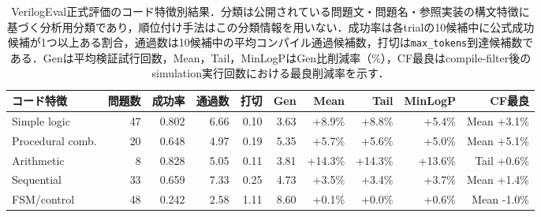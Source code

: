 \begin{table}[t]
\caption{VerilogEval正式評価のコード特徴別結果．分類は公開されている問題文・問題名・参照実装の構文特徴に基づく分析用分類であり，順位付け手法はこの分類情報を用いない．成功率は各trialの10候補中に公式成功候補が1つ以上ある割合，通過数は10候補中の平均コンパイル通過候補数，打切は\texttt{max\_tokens}到達候補数である．Genは平均検証試行回数，Mean，Tail，MinLogPはGen比削減率（\%），CF最良はcompile-filter後のsimulation実行回数における最良削減率を示す．}
\label{tab:verilog_eval_feature}
\centering
\small
\setlength{\tabcolsep}{3pt}
\begin{tabular}{@{}lrrrrrrrrr@{}}
\hline
コード特徴 & 問題数 & 成功率 & 通過数 & 打切 & Gen & Mean & Tail & MinLogP & CF最良 \\
\hline
Simple logic & 47 & 0.802 & 6.66 & 0.10 & 3.63 & +8.9\% & +8.8\% & +5.4\% & Mean +3.1\% \\
Procedural comb. & 20 & 0.648 & 4.97 & 0.19 & 5.35 & +5.7\% & +5.6\% & +5.0\% & Mean +5.1\% \\
Arithmetic & 8 & 0.828 & 5.05 & 0.11 & 3.81 & +14.3\% & +14.3\% & +13.6\% & Tail +0.6\% \\
Sequential & 33 & 0.659 & 7.33 & 0.25 & 4.73 & +3.5\% & +3.4\% & +3.7\% & Mean +1.4\% \\
FSM/control & 48 & 0.242 & 2.58 & 1.11 & 8.60 & +0.1\% & +0.0\% & +0.6\% & Mean -1.0\% \\
\hline
\end{tabular}
\end{table}

